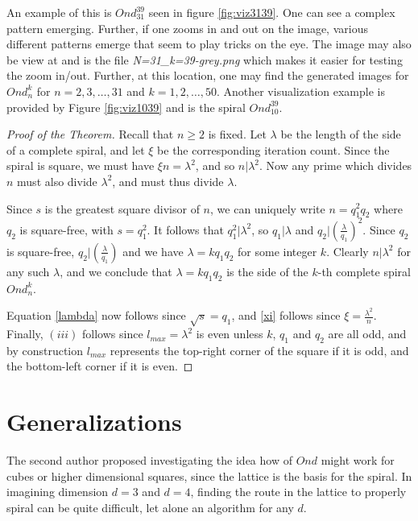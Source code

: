 \documentclass[11pt,reqno]{amsart}
\theoremstyle{mydef}
\begin{document}
An example of this is $Ond^{39}_{31}$ seen in figure \ref{fig:viz3139}. One can
see a complex pattern emerging.  Further, if one zooms
in and out on the image, various different patterns emerge that seem
to play tricks on the eye.  The image may also be view at
\cite{GraySquare} and is the file \textit{N=31\_k=39-grey.png} which
makes it easier for testing the zoom in/out.  Further, at this
location, one may find the generated images for $Ond^k_n$ for $n=2, 3,
\ldots, 31$ and $k=1,2, \ldots, 50$. Another visualization example is provided by Figure
\ref{fig:viz1039} and is the spiral $Ond^{39}_{10}$.


\begin{proof}[Proof of the Theorem]
  Recall that $n\ge 2$ is fixed.  Let $\lambda$ be the length of the
  side of a complete spiral, and let $\xi$ be the corresponding
  iteration count.  Since the spiral is square, we must have $\xi n =
  \lambda^2$, and so $n \vert \lambda^2$.  Now any prime which divides
  $n$ must also divide $\lambda^2$, and must thus divide $\lambda$.

  Since $s$ is the greatest square divisor of $n$, we can uniquely
  write $n = q^2_1 q_2$ where $q_2$ is square-free, with $s = q_1^2$.
  It follows that $q_1^2\vert\lambda^2$, so $q_1|\lambda$ and $q_2 \vert
  (\frac{\lambda}{q_1})^2$.  Since $q_2$ is square-free, $q_2\vert (\frac{\lambda}{q_1})$
  and we have $\lambda = k q_1 q_2$ for some integer $k$.  Clearly
  $n\vert\lambda^2$ for any such $\lambda$, and we conclude that $\lambda
  = k q_1 q_2$ is the side of the $k$-th complete spiral $Ond^k_n$.

  Equation \eqref{lambda} now follows since $\sqrt{s} = q_1$, and
  \eqref{xi} follows since $\xi = \frac{\lambda^2}{n}$.  Finally, $(iii)$
  follows since $l_{max} = \lambda^2$ is even unless $k$, $q_1$ and
  $q_2$ are all odd, and by construction $l_{max}$ represents the
  top-right corner of the square if it is odd, and the bottom-left
  corner if it is even.
\end{proof}


\section{Generalizations}

The second author proposed investigating the idea how of $Ond$ might
work for cubes or higher dimensional squares, since the lattice is the
basis for the spiral. In imagining dimension $d = 3$ and $d=4$, finding
the route in the lattice to properly spiral can be quite difficult, let alone an algorithm 
for any $d$. 
\end{document}
